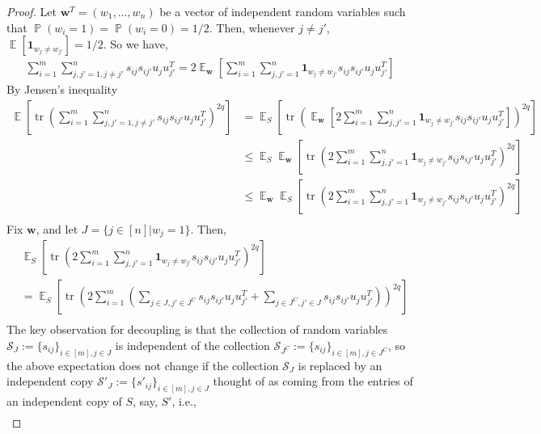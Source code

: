 \documentclass[11pt]{amsart}
\numberwithin{equation}{section}
\numberwithin{equation}{section}
\DeclareMathOperator{\E}{\mathbb{E}}
\DeclareMathOperator{\Pb}{\mathbb{P}}
\DeclareMathOperator*{\tr}{tr}
\theoremstyle{remark}
\theoremstyle{definition}
\begin{document}
\begin{proof}
    Let $\mathbf{w}^T = (w_1, \ldots, w_n)$ be a vector of independent random variables such that $\Pb(w_i=1)=\Pb(w_i=0)=1/2$. Then, whenever $j\neq j'$, $\E[\mathbf{1}_{w_j \neq w_{j'}}] = 1/2$. So we have, 
    \begin{align*}
        \sum_{i=1}^m \sum_{j,j' =1, j \neq j'}^n s_{ij}s_{ij'} u_ju_{j'}^T = 2\E_{\mathbf{w}} \left[ \sum_{i=1}^m \sum_{j,j' =1}^n \mathbf{1}_{w_j \neq w_{j'}} s_{ij}s_{ij'} u_ju_{j'}^T \right]
    \end{align*}
    By Jensen's inequality \cite[Lemma 4.5, p.86]{kallenberg2021foundations}
    \begin{align*}
        \E \left[ \tr \left( \sum_{i=1}^m \sum_{j,j' =1, j \neq j'}^n s_{ij}s_{ij'} u_ju_{j'}^T \right)^{2q} \right] &= \E_S \left[ \tr \left( \E_{\mathbf{w}} \left[ 2 \sum_{i=1}^m \sum_{j,j' =1}^n  \mathbf{1}_{w_j \neq w_{j'}} s_{ij}s_{ij'} u_ju_{j'}^T \right] \right)^{2q} \right] \\
        &\le \E_S \E_{\mathbf{w}} \left[ \tr \left(   2 \sum_{i=1}^m \sum_{j,j' =1}^n  \mathbf{1}_{w_j \neq w_{j'}} s_{ij}s_{ij'} u_ju_{j'}^T  \right)^{2q} \right] \\
        &\le \E_{\mathbf{w}} \E_S \left[ \tr \left(   2 \sum_{i=1}^m \sum_{j,j' =1}^n  \mathbf{1}_{w_j \neq w_{j'}} s_{ij}s_{ij'} u_ju_{j'}^T  \right)^{2q} \right] \\
    \end{align*}
Fix $\mathbf{w}$, and let $J = \{ j \in [n] | w_j=1 \}$. Then,
\begin{align*}
    &\E_S \left[ \tr \left(   2 \sum_{i=1}^m \sum_{j,j' =1}^n  \mathbf{1}_{w_j \neq w_{j'}} s_{ij}s_{ij'} u_ju_{j'}^T  \right)^{2q} \right] \\ &= \E_S \left[ \tr \left(   2 \sum_{i=1}^m \left( \sum_{j\in J, j' \in J^C}   s_{ij}s_{ij'} u_ju_{j'}^T + \sum_{j\in J^C, j' \in J}   s_{ij}s_{ij'} u_ju_{j'}^T \right) \right)^{2q} \right] \\
\end{align*}
The key observation for decoupling is that the collection of random variables $ \mathcal{S}_J := \{s_{ij} \}_{i \in [m], j\in J}$ is independent of the collection $\mathcal{S}_{J^C} := \{s_{ij} \}_{i \in [m], j\in J^C}$, so the above expectation does not change if the collection $ \mathcal{S}_J$ is replaced by an independent copy $\mathcal{S}'_J :=\{s'_{ij} \}_{i \in [m], j\in J}$ thought of as coming from the entries of an independent copy of $S$, say, $S'$, i.e.,
\begin{align*}

\end{align*}
\end{proof}
\end{document}
